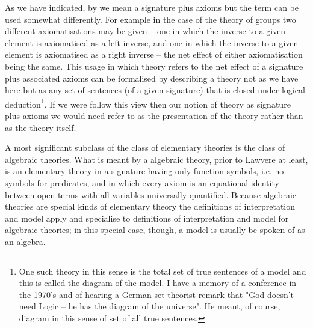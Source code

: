 \note 
As we have indicated, by  we mean a signature plus axioms but 
the term can be used somewhat differently. 
For example in the case of the theory of groups two different axiomatisations may be given 
-- one in which the inverse to a given element is axiomatised as a left inverse, and one in which the inverse to a given element is axiomatised as a right inverse --
the net effect of either axiomatisation being the same.
This usage in which  theory refers to the net effect of a signature plus associated axioms
can be formalised by describing a 
theory not as we have here but as any set of sentences
 (of a given signature) that is closed under logical deduction\footnote{One such theory in this sense is the total set of true sentences of a model and  
this is called the diagram of the model. I have a  memory of a conference in the 1970's and of hearing a German set theorist
 remark that "God doesn't need Logic -- he has the diagram of the universe". He meant, of course, diagram in this sense of set of all true sentences.}. 
If we were follow this view then our notion of theory as  signature plus axioms we would need refer to as the presentation of the theory rather than as the theory itself.

\note
A most significant subclass of the class of elementary theories is the class of algebraic theories. 
What is meant by a algebraic theory, prior to Lawvere at least, is an elementary theory in a signature having only function symbols, i.e. no symbols for predicates, 
and in which every axiom is an equational identity between open terms with all variables universally quantified. 
Because algebraic theories are special kinds of elementary theory the definitions of interpretation and model apply and specialise to definitions of 
interpretation and model for algebraic theories; in this special case, though, a model is usually be spoken of as an algebra.

